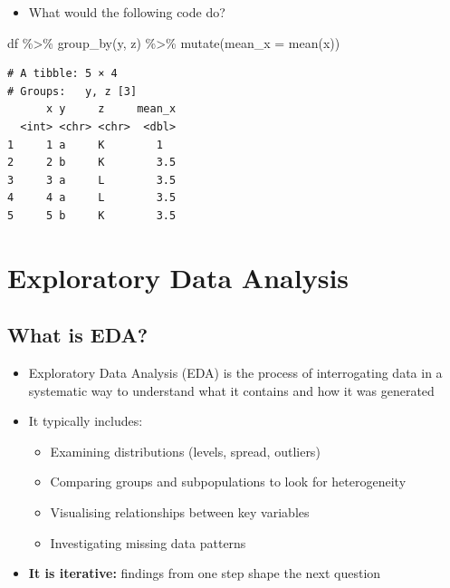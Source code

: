 \documentclass[
  letterpaper,
  DIV=11,
  numbers=noendperiod]{scrartcl}
\newenvironment{Shaded}{\begin{snugshade}}{\end{snugshade}}
\newcommand{\AttributeTok}[1]{\textcolor[rgb]{0.40,0.45,0.13}{#1}}
\newcommand{\FunctionTok}[1]{\textcolor[rgb]{0.28,0.35,0.67}{#1}}
\newcommand{\NormalTok}[1]{\textcolor[rgb]{0.00,0.23,0.31}{#1}}
\newcommand{\SpecialCharTok}[1]{\textcolor[rgb]{0.37,0.37,0.37}{#1}}
\providecommand{\tightlist}{%
  \setlength{\itemsep}{0pt}\setlength{\parskip}{0pt}}
\begin{document}
\begin{itemize}
\tightlist
\item
  What would the following code do?
\end{itemize}

\begin{Shaded}
\begin{Highlighting}[]
\NormalTok{df }\SpecialCharTok{\%\textgreater{}\%}
  \FunctionTok{group\_by}\NormalTok{(y, z) }\SpecialCharTok{\%\textgreater{}\%}
  \FunctionTok{mutate}\NormalTok{(}\AttributeTok{mean\_x =} \FunctionTok{mean}\NormalTok{(x))}
\end{Highlighting}
\end{Shaded}

\begin{verbatim}
# A tibble: 5 × 4
# Groups:   y, z [3]
      x y     z     mean_x
  <int> <chr> <chr>  <dbl>
1     1 a     K        1
2     2 b     K        3.5
3     3 a     L        3.5
4     4 a     L        3.5
5     5 b     K        3.5
\end{verbatim}

\section{Exploratory Data Analysis}\label{exploratory-data-analysis}

\subsection{What is EDA?}\label{what-is-eda}

\begin{itemize}
\tightlist
\item
  Exploratory Data Analysis (EDA) is the process of interrogating data
  in a systematic way to understand what it contains and how it was
  generated
\item
  It typically includes:

  \begin{itemize}
  \tightlist
  \item
    Examining distributions (levels, spread, outliers)
  \item
    Comparing groups and subpopulations to look for heterogeneity
  \item
    Visualising relationships between key variables
  \item
    Investigating missing data patterns
  \end{itemize}
\item
  \textbf{It is iterative:} findings from one step shape the next
  question
\end{itemize}
\end{document}
